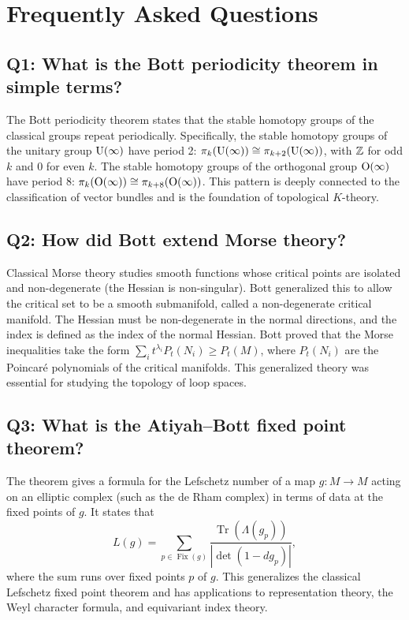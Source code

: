 \section{Frequently Asked Questions}

\subsection*{Q1: What is the Bott periodicity theorem in simple terms?}

The Bott periodicity theorem states that the stable homotopy groups of the classical groups repeat periodically. Specifically, the stable homotopy groups of the unitary group \(\operatorname{U}(\infty)\) have period 2: \(\pi_k(\operatorname{U}(\infty)) \cong \pi_{k+2}(\operatorname{U}(\infty))\), with \(\mathbb{Z}\) for odd \(k\) and 0 for even \(k\). The stable homotopy groups of the orthogonal group \(\operatorname{O}(\infty)\) have period 8: \(\pi_k(\operatorname{O}(\infty)) \cong \pi_{k+8}(\operatorname{O}(\infty))\). This pattern is deeply connected to the classification of vector bundles and is the foundation of topological \(K\)-theory.

\subsection*{Q2: How did Bott extend Morse theory?}

Classical Morse theory studies smooth functions whose critical points are isolated and non-degenerate (the Hessian is non-singular). Bott generalized this to allow the critical set to be a smooth submanifold, called a non-degenerate critical manifold. The Hessian must be non-degenerate in the normal directions, and the index is defined as the index of the normal Hessian. Bott proved that the Morse inequalities take the form \(\sum_i t^{\lambda_i} P_t(N_i) \geq P_t(M)\), where \(P_t(N_i)\) are the Poincar\'e polynomials of the critical manifolds. This generalized theory was essential for studying the topology of loop spaces.

\subsection*{Q3: What is the Atiyah--Bott fixed point theorem?}

The theorem gives a formula for the Lefschetz number of a map \(g: M \to M\) acting on an elliptic complex (such as the de Rham complex) in terms of data at the fixed points of \(g\). It states that
\[
L(g) = \sum_{p \in \operatorname{Fix}(g)} \frac{\operatorname{Tr}(\Lambda(g_p))}{|\det(1 - dg_p)|},
\]
where the sum runs over fixed points \(p\) of \(g\). This generalizes the classical Lefschetz fixed point theorem and has applications to representation theory, the Weyl character formula, and equivariant index theory.

